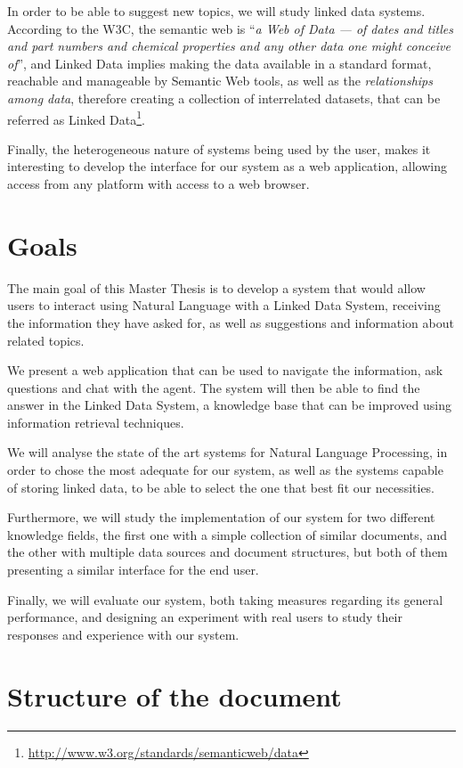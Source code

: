 In order to be able to suggest new topics, we will study linked data systems. According to the W3C, the semantic web is ``\emph{a Web of Data — of dates and titles and part numbers and chemical properties and any other data one might conceive of}'', and Linked Data implies making the data available in a standard format, reachable and manageable by Semantic Web tools, as well as the \emph{relationships among data}, therefore creating a collection of interrelated datasets, that can be referred as Linked Data\footnote{\url{http://www.w3.org/standards/semanticweb/data}}.

Finally, the heterogeneous nature of systems being used by the user, makes it interesting to develop the interface for our system as a web application, allowing access from any platform with access to a web browser.

\section{Goals}

The main goal of this Master Thesis is to develop a system that would allow users to interact using Natural Language with a Linked Data System, receiving the information they have asked for, as well as suggestions and information about related topics.

We present a web application that can be used to navigate the information, ask questions and chat with the agent. The system will then be able to find the answer in the Linked Data System, a knowledge base that can be improved using information retrieval techniques.

We will analyse the state of the art systems for Natural Language Processing, in order to chose the most adequate for our system, as well as the systems capable of storing linked data, to be able to select the one that best fit our necessities.

Furthermore, we will study the implementation of our system for two different knowledge fields, the first one with a simple collection of similar documents, and the other with multiple data sources and document structures, but both of them presenting a similar interface for the end user.

Finally, we will evaluate our system, both taking measures regarding its general performance, and designing an experiment with real users to study their responses and experience with our system.

\section{Structure of the document}

